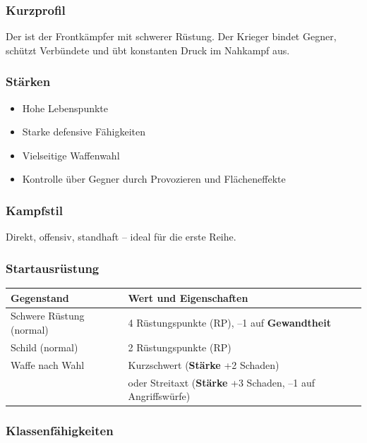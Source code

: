 \subsubsection*{Kurzprofil}
Der  ist der Frontkämpfer mit schwerer Rüstung. Der Krieger bindet Gegner, schützt
Verbündete und übt konstanten Druck im Nahkampf aus.

\subsubsection*{Stärken}
\begin{itemize}
	\item Hohe Lebenspunkte
	\item Starke defensive Fähigkeiten
	\item Vielseitige Waffenwahl
	\item Kontrolle über Gegner durch Provozieren und Flächeneffekte
\end{itemize}

\subsubsection*{Kampfstil}
Direkt, offensiv, standhaft – ideal für die erste Reihe.

\subsubsection*{Startausrüstung}

\begin{center}
	\begin{tabular}{lp{9cm}}
		\toprule
		\textbf{Gegenstand} & \textbf{Wert und Eigenschaften} \\
		\midrule
		Schwere Rüstung (normal) & 4 Rüstungspunkte (RP), --1 auf \textbf{Gewandtheit} \\
		Schild (normal) & 2 Rüstungspunkte (RP) \\
		Waffe nach Wahl &
		Kurzschwert (\textbf{Stärke} +2 Schaden) \\
		& oder Streitaxt (\textbf{Stärke} +3 Schaden, --1 auf Angriffswürfe) \\
		\bottomrule
	\end{tabular}
\end{center}

\subsubsection*{Klassenfähigkeiten}


